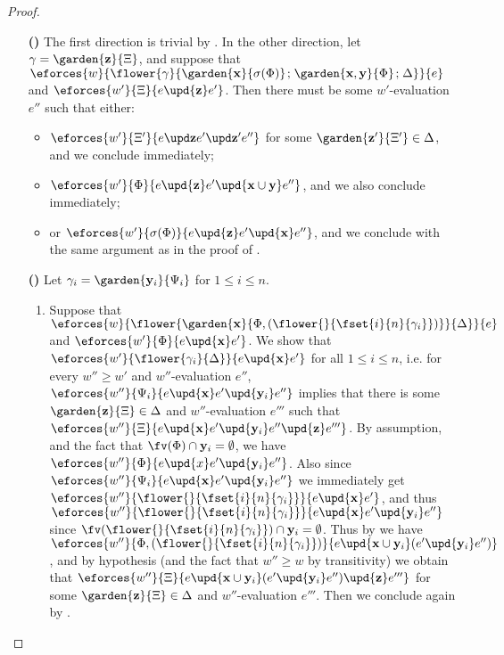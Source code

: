 \begin{proof}
\begin{itemize}
    \item[\textbf{(\rsf{ipet})}] The first direction is trivial by
      . In the other direction, let $\gamma =
      \garden{\bz}{\Xi}$, and suppose that
      $\eforces{w}{\flower{\gamma}{\garden{\bx}{\sigma(\Phi)} \sep
      \garden{\bx,\by}{\Phi} \sep \Delta}}{e}$ and $\eforces{w'}{\Xi}{e
      \upd{\bz} e'}$. Then there must be some $w'$-evaluation $e''$ such that
      either:
      \begin{itemize}
        \item $\eforces{w'}{\Xi'}{\update{e}{\bz}{\update{e'}{\bz'}{e''}}}$ for
        some $\garden{\bz'}{\Xi'} \in \Delta$, and we conclude immediately;
        \item $\eforces{w'}{\Phi}{e \upd{\bz} e' \upd{\bx \cup \by} e''}$, and
        we also conclude immediately;
        \item or $\eforces{w'}{\sigma(\Phi)}{e \upd{\bz} e' \upd{\bx} e''}$, and
        we conclude with the same argument as in the proof of
        .
      \end{itemize}
      
    \item[\textbf{(\rsf{srep})}]
      Let $\gamma_i = \garden{\by_i}{\Psi_i}$ for $1 \leq i \leq n$.
      \begin{enumerate}
        \item Suppose that
        $\eforces{w}{\flower{\garden{\bx}{\Phi,(\flower{}{\fset{i}{n}{\gamma_i}})}}{\Delta}}{e}$
        and $\eforces{w'}{\Phi}{e \upd{\bx} e'}$. We show that
        $\eforces{w'}{\flower{\gamma_i}{\Delta}}{e \upd{\bx} e'}$ for all $1
        \leq i \leq n$, i.e. for every $w'' \geq w'$ and $w''$-evaluation $e''$,
        $\eforces{w''}{\Psi_i}{e \upd{\bx} e' \upd{\by_i} e''}$ implies that
        there is some $\garden{\bz}{\Xi} \in \Delta$ and $w''$-evaluation $e'''$
        such that $\eforces{w''}{\Xi}{e \upd{\bx} e' \upd{\by_i} e'' \upd{\bz}
        e'''}$. By assumption,  and the fact that
        $\fv(\Phi) \cap \by_i = \emptyset$, we have $\eforces{w''}{\Phi}{e
        \upd{x} e' \upd{\by_i} e''}$. Also since $\eforces{w''}{\Psi_i}{e
        \upd{\bx} e' \upd{\by_i} e''}$ we immediately get
        $\eforces{w''}{\flower{}{\fset{i}{n}{\gamma_i}}}{e \upd{\bx} e'}$, and
        thus $\eforces{w''}{\flower{}{\fset{i}{n}{\gamma_i}}}{e \upd{\bx} e'
        \upd{\by_i} e''}$ since $\fv(\flower{}{\fset{i}{n}{\gamma_i}}) \cap
        \by_i = \emptyset$. Thus by  we have
        $\eforces{w''}{\Phi,(\flower{}{\fset{i}{n}{\gamma_i}})}{e \upd{\bx \cup
        \by_i} (e' \upd{\by_i} e'')}$, and by hypothesis (and the fact that $w''
        \geq w$ by transitivity) we obtain that $\eforces{w''}{\Xi}{e \upd{\bx
        \cup \by_i} (e' \upd{\by_i} e'') \upd{\bz} e'''}$ for some
        $\garden{\bz}{\Xi} \in \Delta$ and $w''$-evaluation $e'''$. Then we
        conclude again by .


\end{enumerate}
\end{itemize}
\end{proof}
